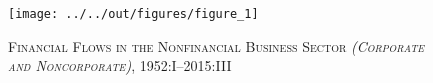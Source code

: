 \begin{figure}[t]
    \centering
    \texttt{[image: ../../out/figures/figure\_1]}
    \caption{\textsc{Financial Flows in the Nonfinancial Business Sector \textit{(Corporate and Noncorporate)}}, 1952:I--2015:III}
    \label{fig:figure_1}
\end{figure}
